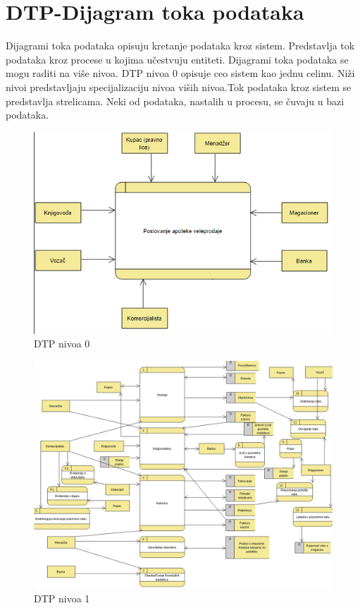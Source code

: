 \section{DTP-Dijagram toka podataka}

Dijagrami toka podataka opisuju kretanje podataka kroz sistem. Predstavlja tok podataka kroz procese u kojima učestvuju entiteti. Dijagrami toka podataka se mogu raditi na više nivoa. DTP nivoa 0 opisuje ceo sistem kao jednu celinu. Niži nivoi predstavljaju specijalizaciju nivoa viših nivoa.Tok podataka kroz sistem se
predstavlja strelicama. Neki od podataka, nastalih u procesu, se čuvaju u bazi podataka.

\begin{figure}[ht]
\centering
\includegraphics{slike/dtp-lvl0.png}%
\caption{DTP nivoa 0}
\end{figure}

\begin{figure}[ht]
\centering
\includegraphics[width=170mm]{slike/dtp-lvl1.png}%
\caption{DTP nivoa 1}
\end{figure}


